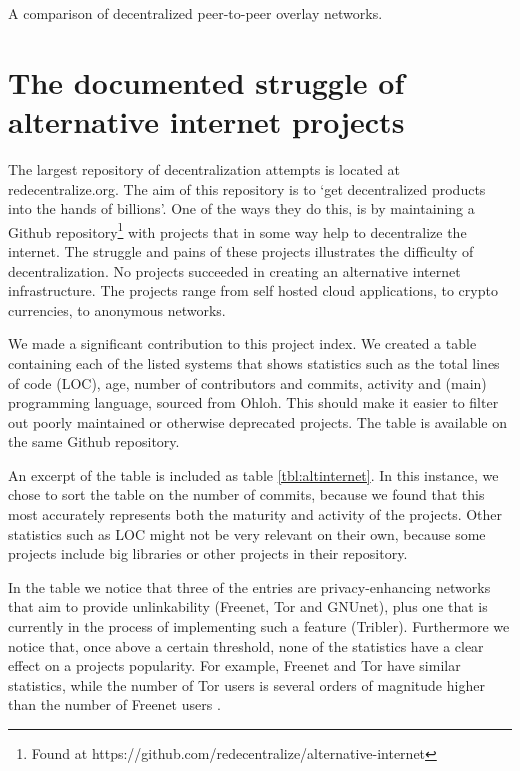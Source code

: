 \documentclass{article}
\begin{document}
		\begin{table}[t]
			\centering
			
			\caption{A comparison of decentralized peer-to-peer overlay networks.}
			\label{tbl:comparison}
		\end{table}

\section{The documented struggle of alternative internet projects}
	\label{sec:comparison}	
	
	The largest repository of decentralization attempts is located at redecentralize.org. The aim of this repository is to \textquoteleft get decentralized products into the hands of billions\textquoteright \cite{aboutredecentralizeorg}. One of the ways they do this, is by maintaining a Github repository\footnote{Found at https://github.com/redecentralize/alternative-internet} with projects that in some way help to decentralize the internet. The struggle and pains of these projects illustrates the difficulty of decentralization. No projects succeeded in creating an alternative internet infrastructure. The projects range from self hosted cloud applications, to crypto currencies, to anonymous networks.

		
	We made a significant contribution to this project index. We created a table containing each of the listed systems that shows statistics such as the total lines of code (LOC), age, number of contributors and commits, activity and (main) programming language, sourced from Ohloh. This should make it easier to filter out poorly maintained or otherwise deprecated projects. The table is available on the same Github repository.
		
	An excerpt of the table is included as table \ref{tbl:altinternet}. In this instance, we chose to sort the table on the number of commits, because we found that this most accurately represents both the maturity and activity of the projects. Other statistics such as LOC might not be very relevant on their own, because some projects include big libraries or other projects in their repository.
		
	In the table we notice that three of the entries are privacy-enhancing networks that aim to provide unlinkability (Freenet, Tor and GNUnet), plus one that is currently in the process of implementing such a feature (Tribler). Furthermore we notice that, once above a certain threshold, none of the statistics have a clear effect on a projects popularity. For example, Freenet and Tor have similar statistics, while the number of Tor users \cite{tormetricsprojectwebsite} is several orders of magnitude higher than the number of Freenet users \cite{freenetstatistics}.
		
\end{document}

